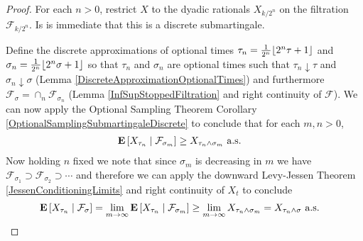 \begin{proof}
For each $n>0$, restrict $X$ to the dyadic rationals $X_{k/2^n}$ on the
filtration $\mathcal{F}_{k/2^n}$.  Is is immediate that this is a
discrete submartingale.

Define the discrete approximations of optional times $\tau_n =
\frac{1}{2^n} \floor{2^n \tau + 1}$ and $\sigma_n = \frac{1}{2^n}
\floor{2^n \sigma + 1}$ so that $\tau_n$ and $\sigma_n$ are optional
times such that $\tau_n \downarrow \tau$ and $\sigma_n \downarrow
\sigma$ (Lemma \ref{DiscreteApproximationOptionalTimes}) and
furthermore $\mathcal{F}_\sigma = \cap_n \mathcal{F}_{\sigma_n}$ (Lemma
\ref{InfSupStoppedFiltration} and right
continuity of $\mathcal{F}$).
We can now apply the Optional Sampling Theorem Corollary
\ref{OptionalSamplingSubmartingaleDiscrete} to conclude that for each
$m,n>0$,
\begin{align*}
\cexpectationlong{\mathcal{F}_{\sigma_m}}{X_{\tau_n}} &\geq X_{\tau_n \wedge
  \sigma_m} \text{ a.s.}
\end{align*}
Now holding $n$ fixed we note that since $\sigma_m$ is decreasing in
$m$ we have $\mathcal{F}_{\sigma_1} \supset
\mathcal{F}_{\sigma_{2}} \supset \cdots$ and therefore we can apply
the downward Levy-Jessen Theorem \ref {JessenConditioningLimits} and
right continuity of $X_t$ to
conclude 
\begin{align*}
\cexpectationlong{\mathcal{F}_{\sigma}}{X_{\tau_n}} &=\lim_{m \to
  \infty} \cexpectationlong{\mathcal{F}_{\sigma_m}}{X_{\tau_n}}  \geq
\lim_{m \to \infty} X_{\tau_n \wedge  \sigma_m} 
= X_{\tau_n \wedge \sigma} \text{ a.s.}
\end{align*}


\end{proof}

